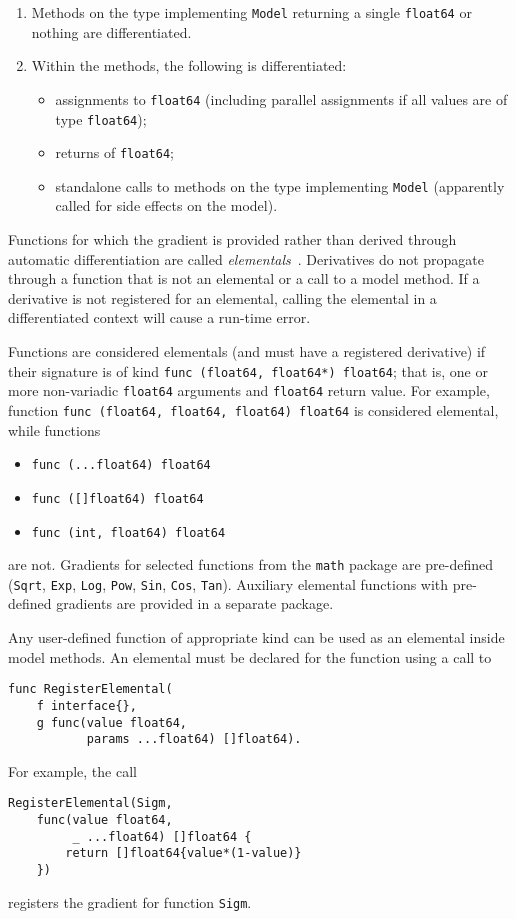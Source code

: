 \documentclass[sigplan,review,10pt,anonymous]{acmart}
\begin{document}
\begin{sloppypar}
\begin{enumerate}
	\item Methods on the type implementing \lstinline{Model} returning a
		single \lstinline{float64} or nothing are differentiated.
	\item Within the methods, the following is differentiated:
		\begin{itemize}
			\item assignments to \lstinline{float64} (including parallel
				assignments if all values are of type
				\lstinline{float64});
			\item returns of \lstinline{float64};
			\item standalone calls to methods on the type implementing
				\lstinline{Model} (apparently called for side  effects on
				the model).
		\end{itemize}
\end{enumerate}

Functions for which the gradient is provided rather than derived
through automatic differentiation are called
\textit{elementals}~\cite{GW08}.  Derivatives do not propagate
through a function that is not an elemental or a call to a model
method. If a derivative is not registered for an elemental,
calling the elemental in a differentiated context will cause a
run-time error.

Functions are considered elementals (and must have a
registered derivative) if their signature is of kind
\lstinline{func (float64, float64*) float64}; that is, 
one or more non-variadic \lstinline{float64} arguments and
\lstinline{float64} return value. For example, function
\lstinline{func (float64, float64, float64) float64}
is considered elemental, while functions
\begin{itemize}
	\item \lstinline{func (...float64) float64}
	\item \lstinline{func ([]float64) float64}
	\item \lstinline{func (int, float64) float64}
\end{itemize}
are not. Gradients for selected functions from the
\lstinline{math} package are pre-defined (\lstinline{Sqrt},
\lstinline{Exp}, \lstinline{Log}, \lstinline{Pow},
\lstinline{Sin}, \lstinline{Cos}, \lstinline{Tan}). Auxiliary
elemental functions with pre-defined gradients are provided in a
separate package.

Any user-defined function of appropriate kind can be used as an
elemental inside model methods. An elemental must be declared
for the function using a call to
\begin{lstlisting}
func RegisterElemental(
	f interface{}, 
	g func(value float64,
		   params ...float64) []float64).
\end{lstlisting} For
example, the call
\begin{lstlisting}
RegisterElemental(Sigm,
	func(value float64,
	     _ ...float64) []float64 {
		return []float64{value*(1-value)}
	})
\end{lstlisting}
registers the gradient for function \lstinline{Sigm}.


\end{sloppypar}
\end{document}
